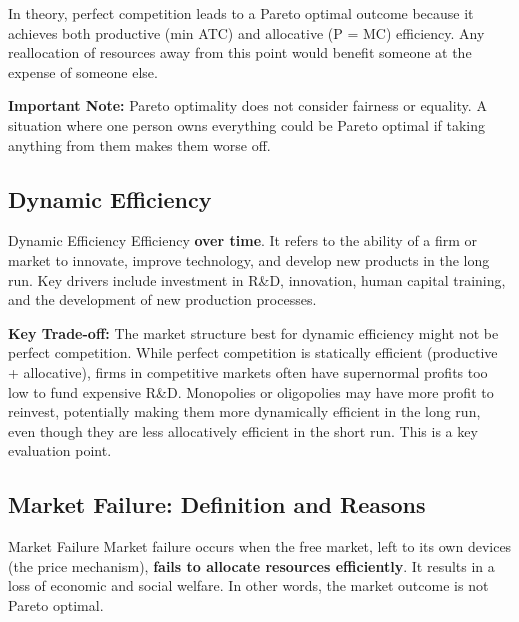 \documentclass[11pt, a4paper, twoside]{book}
\begin{document}
In theory, perfect competition leads to a Pareto optimal outcome because it achieves both productive (min ATC) and allocative (P = MC) efficiency. Any reallocation of resources away from this point would benefit someone at the expense of someone else.

\begin{coreidea}
\textbf{Important Note:} Pareto optimality does not consider fairness or equality. A situation where one person owns everything could be Pareto optimal if taking anything from them makes them worse off.
\end{coreidea}

\subsection{Dynamic Efficiency}

\begin{keyterm}{Dynamic Efficiency}
Efficiency \textbf{over time}. It refers to the ability of a firm or market to innovate, improve technology, and develop new products in the long run. Key drivers include investment in R\&D, innovation, human capital training, and the development of new production processes.
\end{keyterm}

\begin{coreidea}
\textbf{Key Trade-off:} The market structure best for dynamic efficiency might not be perfect competition. While perfect competition is statically efficient (productive + allocative), firms in competitive markets often have supernormal profits too low to fund expensive R\&D. Monopolies or oligopolies may have more profit to reinvest, potentially making them more dynamically efficient in the long run, even though they are less allocatively efficient in the short run. This is a key evaluation point.
\end{coreidea}

\subsection{Market Failure: Definition and Reasons}

\begin{keyterm}{Market Failure}
Market failure occurs when the free market, left to its own devices (the price mechanism), \textbf{fails to allocate resources efficiently}. It results in a loss of economic and social welfare. In other words, the market outcome is not Pareto optimal.
\end{keyterm}
\end{document}
